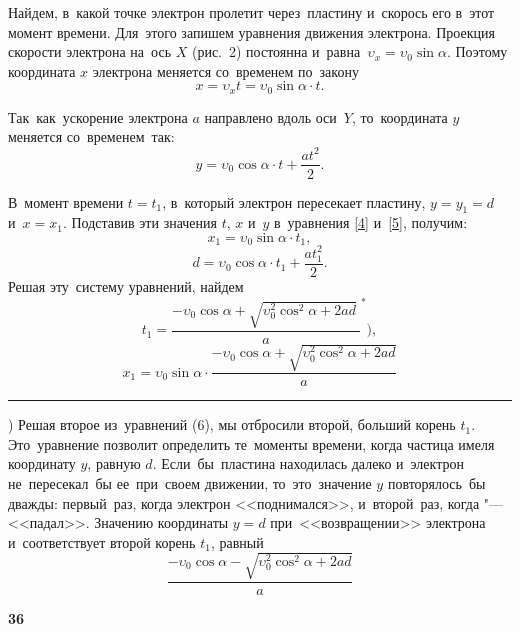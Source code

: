\documentclass[14pt,a4paper]{scrartcl}
\begin{document}
\begin{multicols}{2}
		Найдем, в~какой точке электрон пролетит через~пластину и~скорось его в~этот момент времени. 
		Для~этого запишем уравнения движения электрона. 
		Проекция скорости электрона на~ось $X$ (рис.~2) постоянна и~равна~$\upsilon_x=\upsilon_0 \sin \alpha$. Поэтому координата $x$ электрона меняется со~временем по~закону
		\[
			x=\upsilon_x t = \upsilon_0 \sin \alpha \cdot t. \tag{4} \label{4}
		\]

		Так~как~ускорение электрона $a$ направлено вдоль оси~$Y$, то~координата $y$ меняется со~временем~так:
		\[
			y=\upsilon_0 \cos \alpha \cdot t + \frac{a t^2}{2}. \tag{5} \label{5}
		\]

		В~момент времени $t=t_1$, в~который электрон пересекает пластину, $y=y_1=d$ и~$x=x_1$. Подставив эти значения $t$, $x$ и~$y$ в~уравнения \eqref{4} и~\eqref{5}, получим:
		\[
			x_1=\upsilon_0 \sin \alpha \cdot t_1{,}
		\]
		\[
			d=\upsilon_0 \cos \alpha \cdot t_1 + \frac{a t^2_1}{2}. \tag{6} \label{6}
		\]
		Решая эту~систему уравнений, найдем
		\[
			t_1=\frac{- \upsilon_0 \cos \alpha + \sqrt{\upsilon_0^2 \cos^2 \alpha + 2ad}\ }{a}^*\Biggr), \tag{7} \label{7}
		\]
		\[
			x_1=\upsilon_0 \sin \alpha \cdot \frac{- \upsilon_0 \cos \alpha + \sqrt{\upsilon_0^2 \cos^2 \alpha + 2ad}}{a}
		\]

		\vspace{1mm}
		\noindent\rule{\textwidth}{0,5pt}
		\vspace{1mm}
		
		{\small *) Решая второе из~уравнений (6), мы отбросили второй, больший корень $t_1$. Это~уравнение позволит определить те~моменты времени, когда частица имеля координату $y$, равную $d$. Если~бы~пластина находилась далеко и~электрон не~пересекал~бы ее~при~своем движении, то~это~значение $y$ повторялось~бы дважды: первый~раз, когда электрон <<поднимался>>, и~второй~раз, когда "--- <<падал>>. Значению координаты $y=d$ при~<<возвращении>> электрона и~соответствует второй корень $t_1$, равный
		\[
			\frac{- \upsilon_0 \cos \alpha - \sqrt{\upsilon_0^2 \cos^2 \alpha + 2ad}}{a}
		\]}

	\end{multicols}
	
	\begin{flushleft}
		{\small \textbf{36}}
	\end{flushleft}
\end{document}
